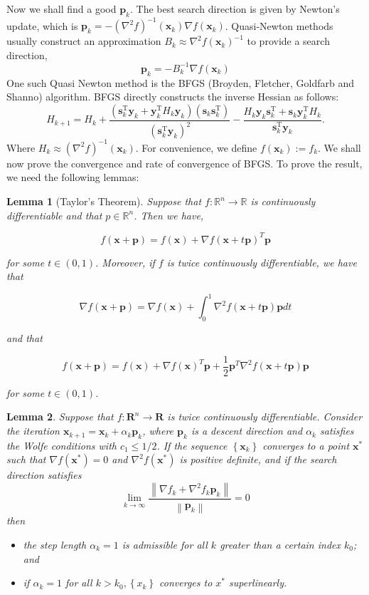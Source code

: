\documentclass[12pt]{report}
\newtheorem{lemma}{Lemma}[section]
\begin{document}
Now we shall find a good $\bm p_k$. The best search direction is given by Newton's update, which is $\bm p_k = -(\nabla^2f)^{-1}(\bm x_k)\nabla f(\bm x_k)$. Quasi-Newton methods usually construct an approximation $B_k \approx \nabla^2 f(\bm x_k)^{-1}$ to provide a search direction,
\begin{equation}
	\bm p_k = -B_k^{-1}\nabla f(\bm x_k) \label{eq:QNupd}
\end{equation}
One such Quasi Newton method is the BFGS (Broyden, Fletcher, Goldfarb and Shanno) algorithm. BFGS directly constructs the inverse Hessian as follows:
\[
	H_{k+1}=H_k+\frac{\left(\bm{s}_k^{\mathrm{T}} \bm{y}_k+\bm{y}_k^{\mathrm{T}} H_k \bm{y}_k\right)\left(\bm{s}_k \bm{s}_k^{\mathrm{T}}\right)}{\left(\bm{s}_k^{\mathrm{T}} \bm{y}_k\right)^2}-\frac{H_k \bm{y}_k \bm{s}_k^{\mathrm{T}}+\bm{s}_k \bm{y}_k^{\mathrm{T}} H_k}{\bm{s}_k^{\mathrm{T}} \bm{y}_k}
	.\]
Where $H_k \approx (\nabla^2f)^{-1}(\bm x_k)$.
For convenience, we define $f(\bm x_k) := f_k$.
We shall now prove the convergence and rate of convergence of BFGS. To prove the result, we need the following lemmas:
\begin{lemma}[Taylor's Theorem]
	Suppose that $f: \mathbb{R}^n \rightarrow \mathbb{R}$ is continuously differentiable and that $p \in \mathbb{R}^n$. Then we have,

	\[
		f(\bm x+\bm p)=f(\bm x)+\nabla f(\bm x+t \bm p)^T \bm p
	\]

	for some $t \in(0,1)$. Moreover, if $f$ is twice continuously differentiable, we have that

	\[
		\nabla f(\bm x+\bm p)=\nabla f(\bm x)+\int_0^1 \nabla^2 f(\bm x+t \bm p) \bm p d t
	\]

	and that

	\[
		f(\bm x+\bm p)=f(\bm x)+\nabla f(\bm x)^T \bm p+\frac{1}{2} \bm p^T \nabla^2 f(\bm x+t \bm p) \bm p
	\]

	for some $t \in(0,1)$.
\end{lemma}
\begin{lemma}
	Suppose that $f: \mathbf{R}^n \rightarrow \mathbf{R}$ is twice continuously differentiable. Consider the iteration $\bm x_{k+1}=\bm x_k+\alpha_k \bm p_k$, where $\bm p_k$ is a descent direction and $\alpha_k$ satisfies the Wolfe conditions with $c_1 \leq 1 / 2$. If the sequence $\left\{\bm x_k\right\}$ converges to a point $\bm x^*$ such that $\nabla f\left(\bm x^*\right)=0$ and $\nabla^2 f\left(\bm x^*\right)$ is positive definite, and if the search direction satisfies
	\begin{equation}
		\lim _{k \rightarrow \infty} \frac{\left\|\nabla f_k+\nabla^2 f_k \bm p_k\right\|}{\left\|\bm p_k\right\|}=0  \label{eq:gcond}
	\end{equation}
	then
	\begin{itemize}
		\item the step length $\alpha_k=1$ is admissible for all $k$ greater than a certain index $k_0$; and
		\item if $\alpha_k=1$ for all $k>k_0,\left\{x_k\right\}$ converges to $x^*$ superlinearly.
	\end{itemize}
\end{lemma}
\end{document}
